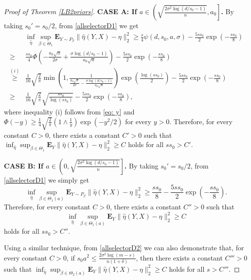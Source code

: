 \documentclass[12pt]{article}
\newtheorem{proof}{Proof}
\begin{document}
\begin{appendix}
\begin{proof}[Proof of Theorem \ref{LB2priors}]
{\bf CASE A: If $a \in \left( \sqrt{ \frac{2\sigma^2\log(d/s_0-1)}{n} }, a_0\right]$. }
By taking $s_0'=s_0/2$, from \eqref{allselectorD1} we get
\begin{equation}
\begin{aligned}
& \inf_{\hat \eta} \sup_{\beta \in {\Theta}_1} \mathbf{E}_{Y\sim P_\beta} \| \hat \eta(Y,X) - \eta \|_2^2 
\ge \frac{s }{4}\psi(d, s_0, a, \sigma) 
    -\frac{5s s_0}2 \exp\left(-\frac{s s_0 }{8}\right) \\
\ge& \frac{ss_0 }{4}{\Phi}\left( -\frac{a_0 \sqrt n}{2\sigma} +\frac{\sigma\log(d/s_0-1)}{a_0 \sqrt n}\right) 
    -\frac{5s s_0}2 \exp\left(-\frac{s s_0 }{8}\right) \\
\overset{(i)}\ge& \frac{1}{16}\sqrt{\frac2\pi} \min\left( 1,
   \frac{1}{\frac{a_0 \sqrt n}{2\sigma} -\frac{\sigma\log(d/s_0-1)}{a_0 \sqrt n}}\right) 
   \exp\left(\frac{\log(s s_0) }{2}\right)
    -\frac{5s s_0}2 \exp\left(-\frac{s s_0 }{8}\right)\\
\ge& \frac{1}{16}\sqrt{\frac2\pi} \sqrt{\frac{ss_0}{\log(ss_0)} }
    -\frac{5s s_0}2 \exp\left(-\frac{s s_0 }{8}\right),
\end{aligned}
\end{equation}
where inequality (i) follows from \eqref{eq: y} and ${\Phi}(-y) \ge \frac{1}{4}\sqrt{\frac2\pi} \left(1 \wedge\frac1y \right)\exp(-y^2/2) $ for every $y>0$. 
Therefore, for every constant $C>0$, there exists a constant $C'>0$ such that $\inf_{\hat \eta} \sup_{\beta \in {\Theta}_1} \mathbf{E}_{Y} \| \hat \eta(Y,X) - \eta \|_2^2 \ge C$ holds for all $ss_0 > C'$.

{\bf CASE B: If $a \in \left(0, \sqrt{ \frac{2\sigma^2\log(d/s_0-1)}{n} } \right]$. }
By taking $s_0'=s_0/2$, from \eqref{allselectorD1} we simply get 
$$
 \inf_{\hat \eta} \sup_{\beta \in {\Theta}_1(a)} \mathbf{E}_{Y\sim P_\beta} \| \hat \eta(Y,X) - \eta \|_2^2 
\ge \frac{s s_0}8 -\frac{5s s_0}2 \exp\left(-\frac{s s_0 }{8}\right).
$$
Therefore, for every constant $C>0$, there exists a constant $C''>0$ such that 
$$\inf_{\hat \eta} \sup_{\beta \in {\Theta}_1(a)} \mathbf{E}_{Y} \| \hat \eta(Y,X) - \eta \|_2^2 \ge C$$ holds for all $ss_0 > C''$.

Using a similar technique, from \eqref{allselectorD2} we can also demonstrate that, for every constant $C>0$, if $s_0 a^2 \le \frac{2 \sigma^2 \log(m-s)}{n(1+\delta)}$, then there exists a constant $C'''>0$ such that $\inf_{\hat \eta} \sup_{\beta \in {\Theta}_2(a)} \mathbf{E}_{Y} \| \hat \eta(Y,X) - \eta \|_2^2 \ge C$ holds for all $s > C'''$.


\end{proof}
\end{appendix}
\end{document}
